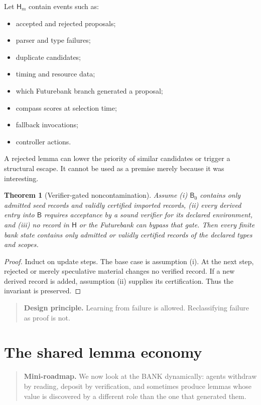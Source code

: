 \documentclass[11pt,openany]{book}
\newtheorem{theorem}{Theorem}[chapter]
\theoremstyle{definition}
\theoremstyle{remark}
\newenvironment{miniroadmap}{\begin{quote}\small\color{deepblue}\textbf{Mini-roadmap.} }{\end{quote}}
\newenvironment{designbox}{\begin{quote}\small\color{green!35!black}\textbf{Design principle.} }{\end{quote}}
\newcommand{\Bank}{\mathsf{B}}
\newcommand{\Hist}{\mathsf{H}}
\begin{document}
Let $\Hist_m$ contain events such as:
\begin{itemize}
\item accepted and rejected proposals;
\item parser and type failures;
\item duplicate candidates;
\item timing and resource data;
\item which Futurebank branch generated a proposal;
\item compass scores at selection time;
\item fallback invocations;
\item controller actions.
\end{itemize}
A rejected lemma can lower the priority of similar candidates or trigger a structural escape. It cannot be used as a premise merely because it was interesting.

\begin{theorem}[Verifier-gated noncontamination]\label{thm:noncontam}
Assume (i) $\Bank_0$ contains only admitted seed records and validly certified imported records, (ii) every derived entry into $\Bank$ requires acceptance by a sound verifier for its declared environment, and (iii) no record in $\Hist$ or the Futurebank can bypass that gate. Then every finite bank state contains only admitted or validly certified records of the declared types and scopes.
\end{theorem}
\begin{proof}
Induct on update steps. The base case is assumption (i). At the next step, rejected or merely speculative material changes no verified record. If a new derived record is added, assumption (ii) supplies its certification. Thus the invariant is preserved.
\end{proof}

\begin{designbox}
Learning from failure is allowed. Reclassifying failure as proof is not.
\end{designbox}

\chapter{The shared lemma economy}
\begin{miniroadmap}
We now look at the BANK dynamically: agents withdraw by reading, deposit by verification, and sometimes produce lemmas whose value is discovered by a different role than the one that generated them.
\end{miniroadmap}
\end{document}
